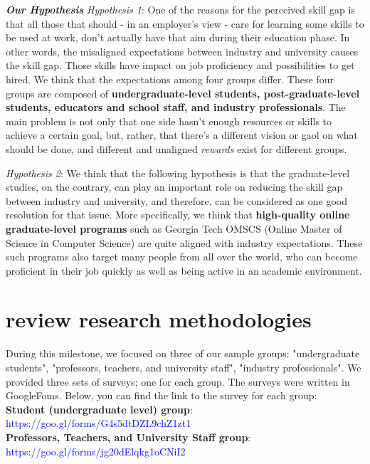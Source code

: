 \documentclass{sigchi}
\begin{document}
\textit{\textbf{Our Hypothesis}}\newline
\textit{Hypothesis 1}: One of the reasons for the perceived skill gap is that all those that should - in an employer's view - care for learning some skills to be used at work, don't actually have that aim during their education phase. In other words, the misaligned expectations between industry and university causes the skill gap. Those skills have impact on job proficiency and possibilities to get hired. We think that the expectations among four groups differ. These four groups are composed of \textbf{undergraduate-level students, post-graduate-level students, educators and school staff, and industry professionals}. The main problem is not only that one side hasn’t enough resources or skills to achieve a certain goal, but, rather, that there’s a different vision or gaol on what should be done, and different and unaligned \textit{rewards} exist for different groups.  

\textit{Hypothesis 2}:  We think that the following hypothesis is that the graduate-level studies, on the contrary, can play an important role on reducing the skill gap between industry and university, and therefore, can be considered as one good resolution for that issue. More specifically, we think that \textbf{high-quality online graduate-level programs} such as Georgia Tech OMSCS (Online Master of Science in Computer Science) are quite aligned with industry expectations. These such programs also target many people from all over the world, who can become proficient in their job quickly as well as being active in an academic environment.

\section{review research methodologies}
During this milestone, we focused on three of our sample groups: "undergraduate students", "professors, teachers, and university staff", "industry professionals". We provided three sets of surveys; one for each group. The surveys were written in GoogleFoms. Below, you can find the link to the survey for each group:\\

\textbf{Student (undergraduate level) group}:\\ \textcolor{blue}{https://goo.gl/forms/G4s5dtDZL9chZ1zt1}\\

\textbf{Professors, Teachers, and University Staff group}: \\ \textcolor{blue}{https://goo.gl/forms/jg20dElqkg1oCNiI2}\\
\end{document}

